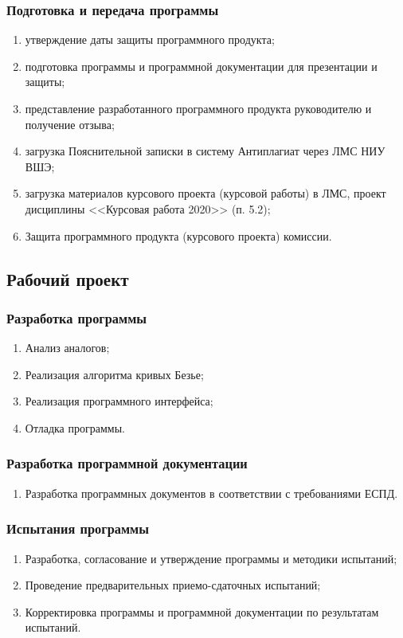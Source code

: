 \documentclass[a4paper,12pt,reqno]{article}
\begin{document}
      \subsubsection*{Подготовка и передача программы}
      \begin{enumerate}
        \item утверждение даты защиты программного продукта;
        \item подготовка программы и программной документации для презентации и защиты;
        \item представление разработанного программного продукта руководителю и получение отзыва;
        \item загрузка Пояснительной записки в систему Антиплагиат через ЛМС НИУ ВШЭ;
        \item загрузка материалов курсового проекта (курсовой работы) в ЛМС, проект дисциплины <<Курсовая работа 2020>> (п. 5.2);
        \item Защита программного продукта (курсового проекта) комиссии.
      \end{enumerate}
    \subsection{Рабочий проект}
      \subsubsection*{Разработка программы}
      \begin{enumerate}
        \item Анализ аналогов;
        \item Реализация алгоритма кривых Безье;
        \item Реализация программного интерфейса;
        \item Отладка программы.
      \end{enumerate}
      \subsubsection*{Разработка программной документации}
      \begin{enumerate}
        \item Разработка программных документов в соответствии с требованиями ЕСПД.
      \end{enumerate}
      \subsubsection*{Испытания программы}
      \begin{enumerate}
        \item Разработка, согласование и утверждение программы и методики испытаний;
        \item Проведение предварительных приемо-сдаточных испытаний;
        \item Корректировка программы и программной документации по результатам испытаний.
      \end{enumerate}
\end{document}
